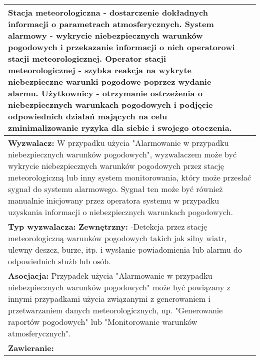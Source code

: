 \documentclass{article}
\begin{document}
\begin{center}
\begin{center}
\begin{tabular}{|l|l|l|}
{        \textbf{Stacja meteorologiczna} - dostarczenie dokładnych informacji o parametrach atmosferycznych.
        \newline
        \textbf{System alarmowy} - wykrycie niebezpiecznych warunków pogodowych i przekazanie informacji o nich operatorowi stacji meteorologicznej.
        \newline
        \textbf{Operator stacji meteorologicznej} - szybka reakcja na wykryte niebezpieczne warunki pogodowe poprzez wydanie alarmu.
        \newline
        \textbf{Użytkownicy} - otrzymanie ostrzeżenia o niebezpiecznych warunkach pogodowych i podjęcie odpowiednich działań mających na celu zminimalizowanie ryzyka dla siebie i swojego otoczenia.} \\
        \hline
        \hline
        \multicolumn{3}{|p{\dimexpr\linewidth-2\tabcolsep-2\arrayrulewidth}|}{\textbf{Wyzwalacz:}
        \newline 
        W przypadku użycia "Alarmowanie w przypadku niebezpiecznych warunków pogodowych",
        wyzwalaczem może być wykrycie niebezpiecznych warunków pogodowych przez stację meteorologiczną
        lub inny system monitorowania, który może przesłać sygnał do systemu alarmowego. 
        Sygnał ten może być również manualnie inicjowany przez operatora systemu w przypadku
        uzyskania informacji o niebezpiecznych warunkach pogodowych.} \\
        \hline
        \hline
        \multicolumn{3}{|p{\dimexpr\linewidth-2\tabcolsep-2\arrayrulewidth}|}{\textbf{Typ wyzwalacza:}
        \newline
        \textbf{Zewnętrzny:}
        \newline
        -Detekcja przez stację meteorologiczną warunków pogodowych takich jak silny wiatr,
        ulewny deszcz, burze, itp. i wysłanie powiadomienia lub alarmu do odpowiednich służb lub osób.} \\
        \hline
        \hline
        \multicolumn{3}{|p{\dimexpr\linewidth-2\tabcolsep-2\arrayrulewidth}|}{\textbf{Asocjacja:}
        \newline
        Przypadek użycia "Alarmowanie w przypadku niebezpiecznych warunków pogodowych"
        może być powiązany z innymi przypadkami użycia związanymi z generowaniem i przetwarzaniem
        danych meteorologicznych, np. "Generowanie raportów pogodowych" lub "Monitorowanie warunków atmosferycznych".} \\
        \hline
        \hline
        \multicolumn{3}{|p{\dimexpr\linewidth-2\tabcolsep-2\arrayrulewidth}|}{\textbf{Zawieranie:}
}
\end{tabular}
\end{center}
\end{center}
\end{document}
